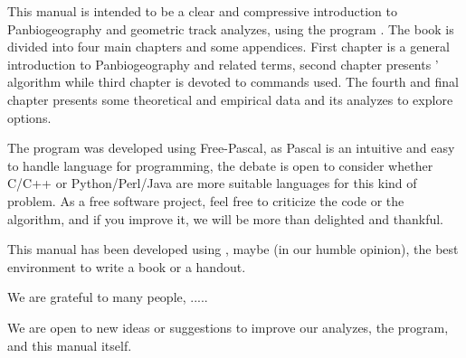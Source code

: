 This manual is intended to be a clear and compressive 
introduction to Panbiogeography and geometric track analyzes, using the program \MT. 
The book is divided into four main chapters and some appendices.
First chapter is a general introduction to Panbiogeography and related terms, second chapter presents
\MT' algorithm while third chapter is devoted to commands used. The fourth and final chapter presents
some theoretical and empirical data and its analyzes to explore \MT options.


\vspace{-7\baselineskip}
\vspace{7\baselineskip}


The program was developed using Free-Pascal, as Pascal is an intuitive and easy to handle language for programming, 
the debate is open to consider whether C/C++ or Python/Perl/Java are more suitable languages for this kind of problem. As a free
software project, feel free to criticize the code or the algorithm, and if you improve it, we will be more than delighted and thankful. 


\vspace{-7\baselineskip}
\vspace{7\baselineskip}

This manual has been developed using \TL, maybe (in our humble opinion), the best environment to write a book or a handout.



We are grateful to many people, .....

We are open to new ideas or suggestions to improve our analyzes, the program, and this manual itself. 

\vspace{-7\baselineskip}
\vspace{7\baselineskip}